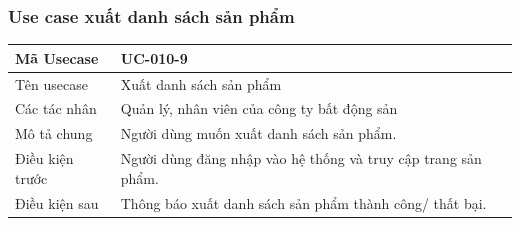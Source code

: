 \documentclass[12pt,a4paper]{article}
\begin{document}
    \subsubsection*{Use case xuất danh sách sản phẩm}
    \begin{table}[H]
        \centering
        \begin{tabular}{|p{3.5cm}|p{11.5cm}|c|}
            \hline
            Mã Usecase      & UC-010-9                                                      \\
            \hline
            Tên usecase     & Xuất danh sách sản phẩm                                       \\
            \hline
            Các tác nhân    & Quản lý, nhân viên của công ty bất động sản                   \\
            \hline
            Mô tả chung     & Người dùng muốn xuất danh sách sản phẩm.                      \\
            \hline

            Điều kiện trước & Người dùng đăng nhập vào hệ thống và truy cập trang sản phẩm. \\
            \hline

            Điều kiện sau   & Thông báo xuất danh sách sản phẩm thành công/ thất bại.       \\
            \hline


\end{tabular}
\end{table}
\end{document}

